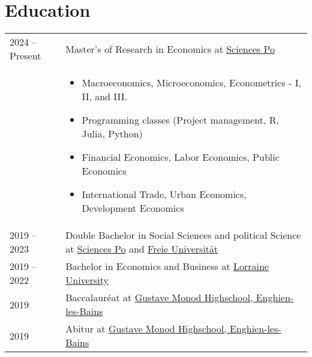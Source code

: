 \documentclass[a4paper,12pt]{article}
\begin{document}
\section{Education}
\begin{tabularx}{\linewidth}{@{}l X@{}}	

2024 – Present & Master's of Research in Economics at \href{https://www.sciencespo.fr/en/}{Sciences Po} \\
& \begin{itemize}
    \item Macroeconomics, Microeconomics, Econometrics - I, II, and III.
    \item Programming classes (Project management, R, Julia, Python)
    \item Financial Economics, Labor Economics, Public Economics
    \item International Trade, Urban Economics, Development Economics
\end{itemize} \\

2019 – 2023 & Double Bachelor in Social Sciences and political Science at \href{https://www.sciencespo.fr/en/}{Sciences Po} and \href{https://www.fu-berlin.de/en/index.html}{Freie Universität}\\

2019 – 2022 & Bachelor in Economics and Business at \href{https://www.univ-lorraine.fr/en/}{Lorraine University}\\

2019 & Baccalauréat at \href{https://www.lyc-polyvalent-monod-enghien.fr/}{Gustave Monod Highschool, Enghien-les-Bains} \hfill \\

2019 & Abitur at \href{https://www.lyc-polyvalent-monod-enghien.fr/}{Gustave Monod Highschool, Enghien-les-Bains} \hfill \\

\end{tabularx}

\end{document}
